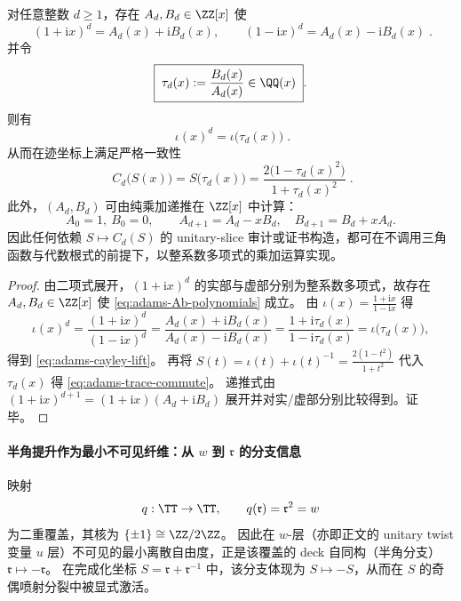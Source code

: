 \begin{proposition}\label{prop:chebyshev-adams-fully-rational}
对任意整数 \(d\ge 1\)，存在 \(A_d,B_d\in\ZZ[x]\) 使
\begin{equation}\label{eq:adams-Ab-polynomials}
\boxed{\;
(1+\mathrm{i}x)^d=A_d(x)+\mathrm{i}B_d(x),\qquad
(1-\mathrm{i}x)^d=A_d(x)-\mathrm{i}B_d(x)\; }.
\end{equation}
并令
\begin{equation}\label{eq:adams-tau-d}
\boxed{\;\tau_d(x):=\frac{B_d(x)}{A_d(x)}\in\QQ(x)\; }.
\end{equation}
则有
\begin{equation}\label{eq:adams-cayley-lift}
\boxed{\;
\iota(x)^d=\iota\!\bigl(\tau_d(x)\bigr)\; }.
\end{equation}
从而在迹坐标上满足严格一致性
\begin{equation}\label{eq:adams-trace-commute}
\boxed{\;
C_d\!\bigl(S(x)\bigr)=S\!\bigl(\tau_d(x)\bigr)
=\frac{2\bigl(1-\tau_d(x)^2\bigr)}{1+\tau_d(x)^2}\; }.
\end{equation}
此外，\((A_d,B_d)\) 可由纯乘加递推在 \(\ZZ[x]\) 中计算：
\[
A_0=1,\ B_0=0,\qquad
A_{d+1}=A_d-xB_d,\quad
B_{d+1}=B_d+xA_d.
\]
因此任何依赖 \(S\mapsto C_d(S)\) 的 unitary-slice 审计或证书构造，都可在不调用三角函数与代数根式的前提下，以整系数多项式的乘加运算实现。
\end{proposition}
\begin{proof}
由二项式展开，\((1+\mathrm{i}x)^d\) 的实部与虚部分别为整系数多项式，故存在 \(A_d,B_d\in\ZZ[x]\) 使 \eqref{eq:adams-Ab-polynomials} 成立。
由 \(\iota(x)=\frac{1+\mathrm{i}x}{1-\mathrm{i}x}\) 得
\[
\iota(x)^d=\frac{(1+\mathrm{i}x)^d}{(1-\mathrm{i}x)^d}
=\frac{A_d(x)+\mathrm{i}B_d(x)}{A_d(x)-\mathrm{i}B_d(x)}
=\frac{1+\mathrm{i}\tau_d(x)}{1-\mathrm{i}\tau_d(x)}
=\iota\!\bigl(\tau_d(x)\bigr),
\]
得到 \eqref{eq:adams-cayley-lift}。
再将 \(S(t)=\iota(t)+\iota(t)^{-1}=\frac{2(1-t^2)}{1+t^2}\) 代入 \(\tau_d(x)\) 得 \eqref{eq:adams-trace-commute}。
递推式由
\(
(1+\mathrm{i}x)^{d+1}=(1+\mathrm{i}x)(A_d+\mathrm{i}B_d)
\)
展开并对实/虚部分别比较得到。证毕。
\end{proof}

\paragraph{半角提升作为最小不可见纤维：从 \(w\) 到 \(\mathfrak{r}\) 的分支信息}
映射
\[
q:\TT\to\TT,\qquad q(\mathfrak{r})=\mathfrak{r}^{2}=w
\]
为二重覆盖，其核为 \(\{\pm 1\}\cong \ZZ/2\ZZ\)。
因此在 \(w\)-层（亦即正文的 unitary twist 变量 \(u\) 层）不可见的最小离散自由度，正是该覆盖的 deck 自同构（半角分支）\(\mathfrak{r}\mapsto-\mathfrak{r}\)。
在完成化坐标 \(S=\mathfrak{r}+\mathfrak{r}^{-1}\) 中，该分支体现为
\(
S\mapsto -S
\)，从而在 \(S\) 的奇偶喷射分裂中被显式激活。

